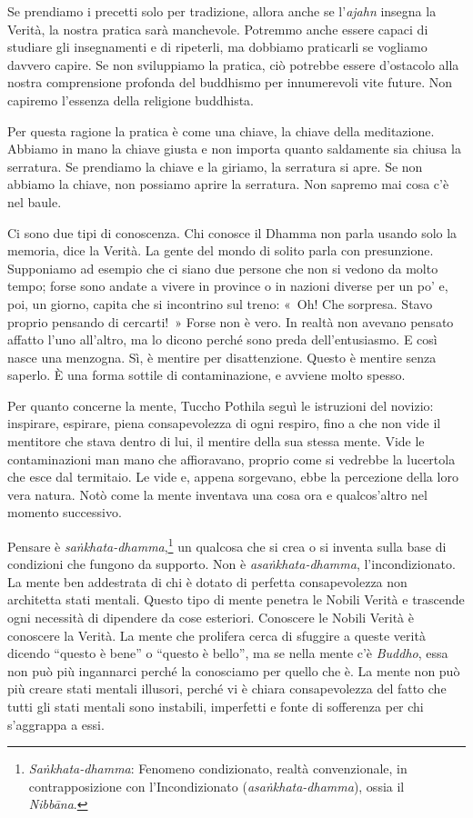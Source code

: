 Se prendiamo i precetti solo per tradizione, allora anche se
l'\emph{ajahn} insegna la Verità, la nostra pratica sarà manchevole.
Potremmo anche essere capaci di studiare gli insegnamenti e di
ripeterli, ma dobbiamo praticarli se vogliamo davvero capire. Se non
sviluppiamo la pratica, ciò potrebbe essere d'ostacolo alla nostra
comprensione profonda del buddhismo per innumerevoli vite future. Non
capiremo l'essenza della religione buddhista.

Per questa ragione la pratica è come una chiave, la chiave della
meditazione. Abbiamo in mano la chiave giusta e non importa quanto
saldamente sia chiusa la serratura. Se prendiamo la chiave e la giriamo,
la serratura si apre. Se non abbiamo la chiave, non possiamo aprire la
serratura. Non sapremo mai cosa c'è nel baule.

Ci sono due tipi di conoscenza. Chi conosce il Dhamma non parla usando
solo la memoria, dice la Verità. La gente del mondo di solito parla con
presunzione. Supponiamo ad esempio che ci siano due persone che non si
vedono da molto tempo; forse sono andate a vivere in province o in
nazioni diverse per un po' e, poi, un giorno, capita che si incontrino
sul treno: «~Oh! Che sorpresa. Stavo proprio pensando di cercarti!~»
Forse non è vero. In realtà non avevano pensato affatto l'uno all'altro,
ma lo dicono perché sono preda dell'entusiasmo. E così nasce una
menzogna. Sì, è mentire per disattenzione. Questo è mentire senza
saperlo. È una forma sottile di contaminazione, e avviene molto spesso.

Per quanto concerne la mente, Tuccho Pothila seguì le istruzioni del
novizio: inspirare, espirare, piena consapevolezza di ogni respiro, fino
a che non vide il mentitore che stava dentro di lui, il mentire della
sua stessa mente. Vide le contaminazioni man mano che affioravano,
proprio come si vedrebbe la lucertola che esce dal termitaio. Le vide e,
appena sorgevano, ebbe la percezione della loro vera natura. Notò come
la mente inventava una cosa ora e qualcos'altro nel momento successivo.

Pensare è \emph{saṅkhata-dhamma},\footnote{\emph{Saṅkhata-dhamma}:
  Fenomeno condizionato, realtà convenzionale, in contrapposizione con
  l'Incondizionato (\emph{asaṅkhata-dhamma}), ossia il \emph{Nibbāna}.}
un qualcosa che si crea o si inventa sulla base di condizioni che
fungono da supporto. Non è \emph{asaṅkhata-dhamma}, l'incondizionato. La
mente ben addestrata di chi è dotato di perfetta consapevolezza non
architetta stati mentali. Questo tipo di mente penetra le Nobili Verità
e trascende ogni necessità di dipendere da cose esteriori. Conoscere le
Nobili Verità è conoscere la Verità. La mente che prolifera cerca di
sfuggire a queste verità dicendo ``questo è bene'' o ``questo è bello'',
ma se nella mente c'è \emph{Buddho}, essa non può più ingannarci perché
la conosciamo per quello che è. La mente non può più creare stati
mentali illusori, perché vi è chiara consapevolezza del fatto che tutti
gli stati mentali sono instabili, imperfetti e fonte di sofferenza per
chi s'aggrappa a essi.

